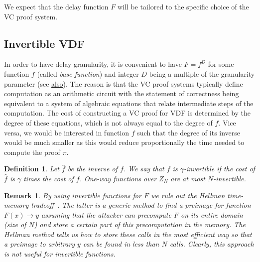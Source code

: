 \documentclass{article}
\newtheorem{definition}{Definition}
\newtheorem{remark}{Remark}
\begin{document}
We expect that the delay function $F$ will be tailored to the specific choice of the VC proof system.

\subsection{ Invertible VDF }

In order to have delay granularity, it is convenient to have $F = f^D$ for some function $f$ (called \emph{base function}) and integer $D$ being a multiple of the granularity parameter (see \href{http://stevengoldfeder.com/papers/BGB17-IEEESB-proof_of_delay_ethereum.pdf}{also}). The reason is that the  VC proof systems typically define computation as an arithmetic circuit  with the statement of correctness being equivalent to a system of algebraic equations that relate intermediate steps of the computation. The cost of constructing a VC proof for VDF is determined by the degree of these equations, which is not always equal to the degree of $f$. Vice versa, we would be interested in function $f$ such that the degree of its inverse would be much smaller as this would reduce proportionally the time  needed to compute the proof $\pi$.


\begin{definition}
Let $\widehat{f}$ be the inverse of $f$. We say that $f$ is $\gamma$-invertible if the cost of $\widehat{f}$ is $\gamma$ times the cost of $f$. One-way functions over $Z_N$ are at most $N$-invertible.
\end{definition}


\begin{remark}
By using invertible functions for $F$ we rule out the  Hellman time-memory tradeoff~\cite{DBLP:journals/tit/Hellman80}. The latter is a generic method to find a preimage for function $F(x)\rightarrow y$ assuming that the attacker can precompute $F$ on its entire domain (size of $N$) and store a certain part of this precomputation in the memory. The Hellman method tells us how to store these calls in the most efficient way so that a preimage to arbitrary $y$ can be found in less than $N$ calls. Clearly, this approach is not useful   for  invertible functions. 

\end{remark}
\end{document}
